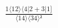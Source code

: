 \documentclass[varwidth, border=5pt]{standalone}
\begin{document}
\begin{my}
$\begin{gathered}
\scriptscriptstyle\frac{1⟨12⟩⟨4|2+3|1]}{⟨14⟩⟨34⟩²}
\end{gathered}$
\end{my}
\end{document}
